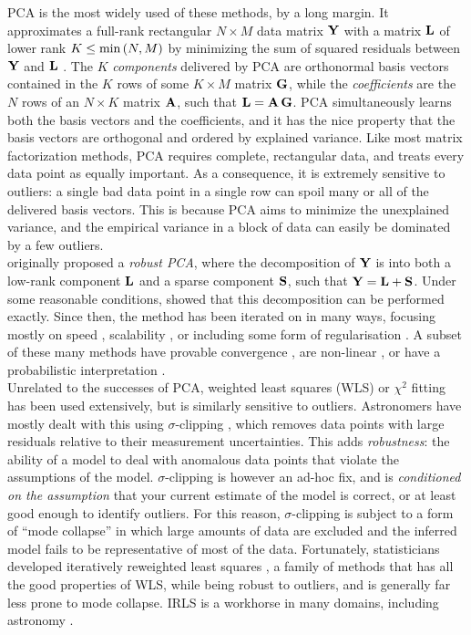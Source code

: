 \documentclass[onecolumn,floatfix]{aastex631}
\begin{document}
PCA is the most widely used of these methods, by a long margin. It approximates a full-rank rectangular $N \times M$ data matrix ${\bf Y}$ with a matrix ${\bf L}$ of lower rank $K \le {\rm min} \, (N, M)$ by minimizing the sum of squared residuals between ${\bf Y}$ and ${\bf L}$ \citep{eckart1936}.
The $K$ \emph{components} delivered by PCA are orthonormal basis vectors contained in the $K$ rows of some $K \times M$ matrix ${\bf G}$, while the \emph{coefficients} are the $N$ rows of an $N \times K$ matrix ${\bf A}$, such that ${\bf L} = {\bf A}\,{\bf G}$.
PCA simultaneously learns both the basis vectors and the coefficients, and it has the nice property that the basis vectors are orthogonal and ordered by explained variance. Like most matrix factorization methods, PCA requires complete, rectangular data, and treats every data point as equally important. As a consequence, it is extremely sensitive to outliers: a single bad data point in a single row can spoil many or all of the delivered basis vectors.
This is because PCA aims to minimize the unexplained variance, and the empirical variance in a block of data can easily be dominated by a few outliers.\\

\citet{candes2011} originally proposed a \emph{robust PCA}, where the decomposition of ${\bf Y}$ is into both a low-rank component ${\bf L}$ and a sparse component ${\bf S}$, such that ${\bf Y} = {\bf L} + {\bf S}$.
Under some reasonable conditions, \citet{candes2011} showed that this decomposition can be performed exactly.
Since then, the method has been iterated on in many ways, focusing mostly on speed \citep{lin2010}, scalability \citep{rodriguez2013, halko2011}, or including some form of regularisation \citep{guyon2012, wohlberg2012}.
A subset of these many methods have provable convergence \citep{netrapalli2014}, are non-linear \citep{scholkopf1998, wohlberg2012}, or have a probabilistic interpretation \citep{tipping1999}.\\

Unrelated to the successes of PCA, weighted least squares (WLS) or $\chi^2$ fitting \citep{legendre1805} has been used extensively, but is similarly sensitive to outliers.
Astronomers have mostly dealt with this using $\sigma$-clipping \citep{hoaglin1983}, which removes data points with large residuals relative to their measurement uncertainties.
This adds \emph{robustness}: the ability of a model to deal with anomalous data points that violate the assumptions of the model.
$\sigma$-clipping is however an ad-hoc fix, and is \emph{conditioned on the assumption} that your current estimate of the model is correct, or at least good enough to identify outliers. For this reason, $\sigma$-clipping is subject to a form of ``mode collapse'' in which large amounts of data are excluded and the inferred model fails to be representative of most of the data.
Fortunately, statisticians developed iteratively reweighted least squares \citep[IRLS;][]{holland1977}, a family of methods that has all the good properties of WLS, while being robust to outliers, and is generally far less prone to mode collapse. IRLS is a workhorse in many domains, including astronomy \citep{hogg2010}.\\
\end{document}
